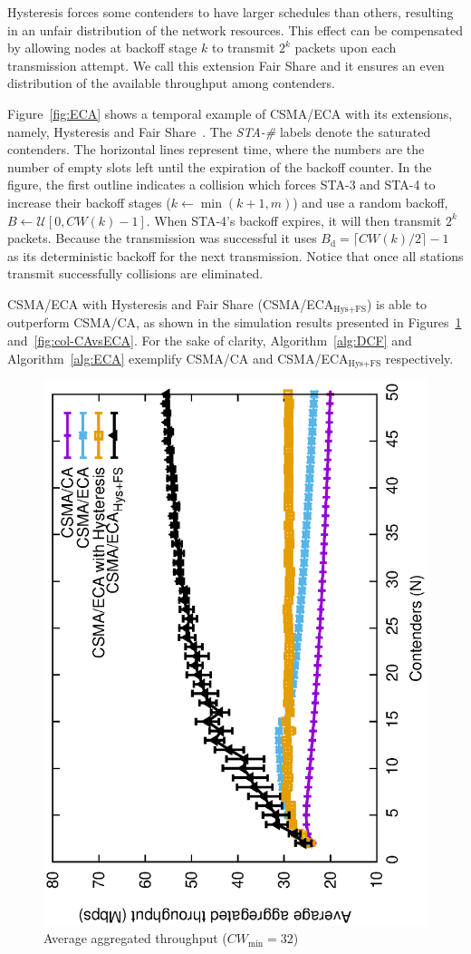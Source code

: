 Hysteresis forces some contenders to have larger schedules than others, resulting in an unfair distribution of the network resources. This effect can be compensated by allowing nodes at backoff stage $k$ to transmit $2^{k}$ packets upon each transmission attempt. We call this extension Fair Share and it ensures an even distribution of the available throughput among contenders.

Figure~\ref{fig:ECA} shows a temporal example of CSMA/ECA with its extensions, namely, Hysteresis and Fair Share~\cite{sanabria2014high}. The \emph{STA-\#} labels denote the saturated contenders. The horizontal lines represent time, where the numbers are the number of empty slots left until the expiration of the backoff counter. In the figure, the first outline indicates a collision which forces STA-3 and STA-4 to increase their backoff stages ($k \leftarrow \min(k+1,m)$) and use a random backoff, $B\leftarrow\mathcal{U}[0,CW(k)-1]$. When STA-4's backoff expires, it will then transmit $2^{k}$ packets. Because the transmission was successful it uses $B_{\text{d}}=\lceil CW(k)/2\rceil-1$ as its deterministic backoff for the next transmission. Notice that once all stations transmit successfully collisions are eliminated.

CSMA/ECA with Hysteresis and Fair Share (CSMA/ECA$_{\text{Hys+FS}}$) is able to outperform CSMA/CA, as shown in the simulation results presented in Figures~\ref{fig:CAvsECA} and~\ref{fig:col-CAvsECA}. For the sake of clarity, Algorithm~\ref{alg:DCF} and Algorithm~\ref{alg:ECA} exemplify CSMA/CA and CSMA/ECA$_{\text{Hys+FS}}$ respectively.

	\begin{figure}[tb]
	\centering
		\includegraphics[width=0.7\linewidth, angle=-90]{figures/throughput-perfectChannel.eps}
		\caption{Average aggregated throughput ($CW_{\min}=32$)\cite{sanabria2014high}}
		\label{fig:CAvsECA}
	\end{figure}
	
